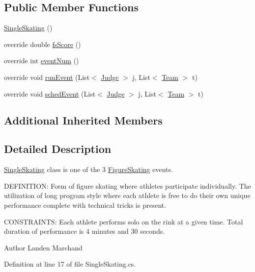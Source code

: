 \subsection*{Public Member Functions}
\begin{DoxyCompactItemize}
\item 
\hyperlink{classPCO_1_1SingleSkating_ae7c9d29f9cde56cd158564c20854f482}{Single\+Skating} ()
\item 
override double \hyperlink{classPCO_1_1SingleSkating_a36f8a341cc9e3259d898eb4ff15a98ec}{fs\+Score} ()
\item 
override int \hyperlink{classPCO_1_1SingleSkating_ab7ac6446917e2d9fa363291ec473567d}{event\+Num} ()
\item 
override void \hyperlink{classPCO_1_1SingleSkating_aae06189e3102d74a26b7af29338a168a}{run\+Event} (List$<$ \hyperlink{classPCO_1_1Judge}{Judge} $>$ j, List$<$ \hyperlink{classPCO_1_1Team}{Team} $>$ t)
\item 
override void \hyperlink{classPCO_1_1SingleSkating_ae97935dfac37a5818431c5b9de138345}{sched\+Event} (List$<$ \hyperlink{classPCO_1_1Judge}{Judge} $>$ j, List$<$ \hyperlink{classPCO_1_1Team}{Team} $>$ t)
\end{DoxyCompactItemize}
\subsection*{Additional Inherited Members}


\subsection{Detailed Description}
\hyperlink{classPCO_1_1SingleSkating}{Single\+Skating} class is one of the 3 \hyperlink{classPCO_1_1FigureSkating}{Figure\+Skating} events. 

D\+E\+F\+I\+N\+I\+T\+I\+O\+N\+: Form of figure skating where athletes participate individually. The utilization of long program style where each athlete is free to do their own unique performance complete with technical tricks is present.

C\+O\+N\+S\+T\+R\+A\+I\+N\+T\+S\+: Each athlete performs solo on the rink at a given time. Total duration of performance is 4 minutes and 30 seconds.\begin{DoxyAuthor}{Author}
Landen Marchand 
\end{DoxyAuthor}


Definition at line 17 of file Single\+Skating.\+cs.



